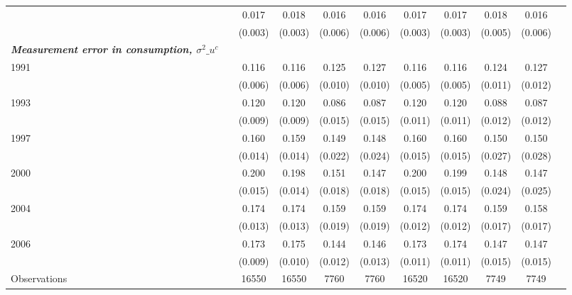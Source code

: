 \begin{tabular}{l*{10}{c}}
\hspace{.3cm}       &            &       0.017&       0.018&       0.016&       0.016&       0.017&       0.017&       0.018&       0.016\\
                    &            &     (0.003)&     (0.003)&     (0.006)&     (0.006)&     (0.003)&     (0.003)&     (0.005)&     (0.006)\\
\textbf{\emph{Measurement error in consumption, $\sigma^2\_{u^c}$}}&            &            &            &            &            &            &            &            &            \\
\hspace{.3cm} 1991  &            &       0.116&       0.116&       0.125&       0.127&       0.116&       0.116&       0.124&       0.127\\
                    &            &     (0.006)&     (0.006)&     (0.010)&     (0.010)&     (0.005)&     (0.005)&     (0.011)&     (0.012)\\
\hspace{.3cm} 1993  &            &       0.120&       0.120&       0.086&       0.087&       0.120&       0.120&       0.088&       0.087\\
                    &            &     (0.009)&     (0.009)&     (0.015)&     (0.015)&     (0.011)&     (0.011)&     (0.012)&     (0.012)\\
\hspace{.3cm} 1997  &            &       0.160&       0.159&       0.149&       0.148&       0.160&       0.160&       0.150&       0.150\\
                    &            &     (0.014)&     (0.014)&     (0.022)&     (0.024)&     (0.015)&     (0.015)&     (0.027)&     (0.028)\\
\hspace{.3cm} 2000  &            &       0.200&       0.198&       0.151&       0.147&       0.200&       0.199&       0.148&       0.147\\
                    &            &     (0.015)&     (0.014)&     (0.018)&     (0.018)&     (0.015)&     (0.015)&     (0.024)&     (0.025)\\
\hspace{.3cm} 2004  &            &       0.174&       0.174&       0.159&       0.159&       0.174&       0.174&       0.159&       0.158\\
                    &            &     (0.013)&     (0.013)&     (0.019)&     (0.019)&     (0.012)&     (0.012)&     (0.017)&     (0.017)\\
\hspace{.3cm} 2006  &            &       0.173&       0.175&       0.144&       0.146&       0.173&       0.174&       0.147&       0.147\\
                    &            &     (0.009)&     (0.010)&     (0.012)&     (0.013)&     (0.011)&     (0.011)&     (0.015)&     (0.015)\\
\midrule
Observations        &            &       16550&       16550&        7760&        7760&       16520&       16520&        7749&        7749\\
\bottomrule
\end{tabular}
